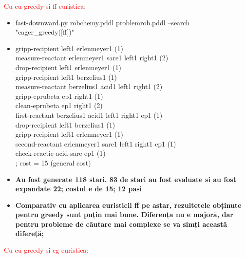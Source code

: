 \textcolor{red}{Cu cu greedy si ff euristica:}
   \begin{itemize}
    \setlength\itemsep{0em}
    \item   fast-downward.py robchemy.pddl problemrob.pddl --search "eager\_greedy([ff])"
    \item gripp-recipient left1 erlenmeyer1 (1)\\
measure-reactant erlenmeyer1 sare1 left1 right1 (2)\\
drop-recipient left1 erlenmeyer1 (1)\\
gripp-recipient left1 berzelius1 (1)\\
measure-reactant berzelius1 acid1 left1 right1 (2)\\
gripp-eprubeta ep1 right1 (1)\\
clean-eprubeta ep1 right1 (2)\\
first-reactant berzelius1 acid1 left1 right1 ep1 (1)\\
drop-recipient left1 berzelius1 (1)\\
gripp-recipient left1 erlenmeyer1 (1)\\
second-reactant erlenmeyer1 sare1 left1 right1 ep1 (1)\\
check-reactie-acid-sare ep1 (1)\\
; cost = 15 (general cost)
    \item \textbf{Au fost generate 118 stari. 83 de stari au fost evaluate si au fost expandate 22; costul e de 15; 12 pasi}
    \item \textbf{Comparativ cu aplicarea euristicii ff pe astar, rezultetele obținute pentru greedy sunt puțin mai bune. Diferența nu e majoră, dar pentru probleme de căutare mai complexe se va simți această difereță;}
\end{itemize}
\textcolor{red}{Cu cu greedy si cg euristica:}
